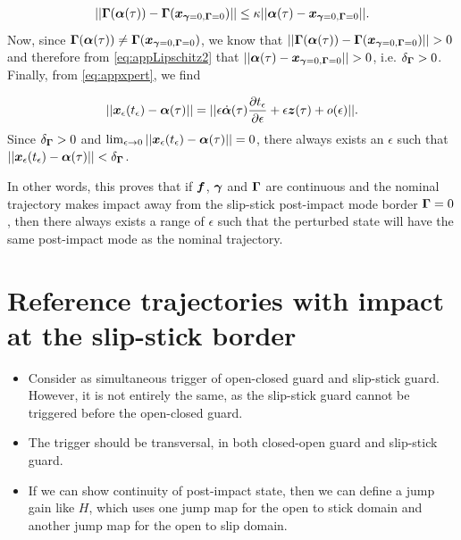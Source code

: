 \documentclass[../DC2017114Bouma.tex]{subfiles}
\begin{document}
\begin{align}
||\boldsymbol{\Gamma}(\boldsymbol{\alpha}(\tau)) - \boldsymbol{\Gamma}({\boldsymbol{x}}_{\boldsymbol{\gamma}=0,\boldsymbol{\Gamma}=0})||\leq \kappa||\boldsymbol{\alpha}(\tau)-{\boldsymbol{x}}_{\boldsymbol{\gamma}=0,\boldsymbol{\Gamma}=0}||.\label{eq:appLipschitz2}
\end{align}
Now, since $\boldsymbol{\Gamma}(\boldsymbol{\alpha}(\tau))\neq \boldsymbol{\Gamma}({\boldsymbol{x}}_{\boldsymbol{\gamma}=0,\boldsymbol{\Gamma}=0})$, we know that $||\Gammab(\alphab(\tau)) - \Gammab(\xb_{\gammab=0,\Gammab=0})||>0$ and therefore from \eqref{eq:appLipschitz2} that $||\alphab(\tau)-\xb_{\gammab=0,\Gammab=0}||>0$, i.e. $\delta_{\boldsymbol{\Gamma}} >0$. Finally, from \eqref{eq:appxpert}, we find

\begin{align}
||{\boldsymbol{x}}_\epsilon(t_\epsilon) - \boldsymbol{\alpha}(\tau)|| = ||\epsilon\dot{\boldsymbol{\alpha}}(\tau)\frac{\partial t_\epsilon}{\partial \epsilon} + \epsilon{\boldsymbol{z}}(\tau) + o(\epsilon)||.
\end{align}
Since $\delta_{\boldsymbol{\Gamma}} > 0$ and $\lim_{\epsilon\rightarrow 0}||{\boldsymbol{x}}_\epsilon(t_\epsilon) - \boldsymbol{\alpha}(\tau)||=0$, there always exists an $\epsilon$ such that $||{\boldsymbol{x}}_\epsilon(t_\epsilon) - \boldsymbol{\alpha}(\tau)||<\delta_{\boldsymbol{\Gamma}}$. 

In other words, this proves that if ${\boldsymbol{f}}$, $\boldsymbol{\gamma}$ and $\boldsymbol{\Gamma}$ are continuous and the nominal trajectory makes impact away from the slip-stick post-impact mode border $\boldsymbol{\Gamma} = 0$, then there always exists a range of $\epsilon$ such that the perturbed state will have the same post-impact mode as the nominal trajectory.


\section{Reference trajectories with impact at the slip-stick border}

\begin{itemize}
	\item Consider as simultaneous trigger of open-closed guard and slip-stick guard. However, it is not entirely the same, as the slip-stick guard cannot be triggered before the open-closed guard.
	\item The trigger should be transversal, in both closed-open guard and slip-stick guard.
	\item If we can show continuity of post-impact state, then we can define a jump gain like $H$, which uses one jump map for the open to stick domain and another jump map for the open to slip domain.
\end{itemize}
\end{document}
